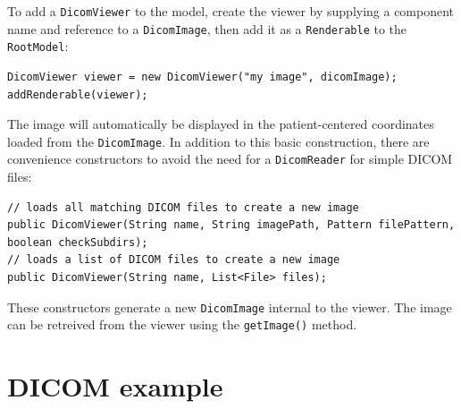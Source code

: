 To add a \lstinline{DicomViewer} to the model, create the viewer by supplying a component name
and reference to a \lstinline{DicomImage}, then add it as a \lstinline{Renderable} to the \lstinline{RootModel}:
\begin{lstlisting}[]
DicomViewer viewer = new DicomViewer("my image", dicomImage);
addRenderable(viewer);
\end{lstlisting}
The image will automatically be displayed in the patient-centered coordinates loaded 
from the \lstinline{DicomImage}.  In addition to this basic construction, there 
are convenience constructors to avoid the need for a \lstinline{DicomReader}
for simple DICOM files:
\begin{lstlisting}[]
// loads all matching DICOM files to create a new image
public DicomViewer(String name, String imagePath, Pattern filePattern, boolean checkSubdirs);
// loads a list of DICOM files to create a new image
public DicomViewer(String name, List<File> files);
\end{lstlisting}
These constructors generate a new \lstinline{DicomImage} internal to the viewer.  The image
can be retreived from the viewer using the \lstinline{getImage()} method.

\section{DICOM example}


